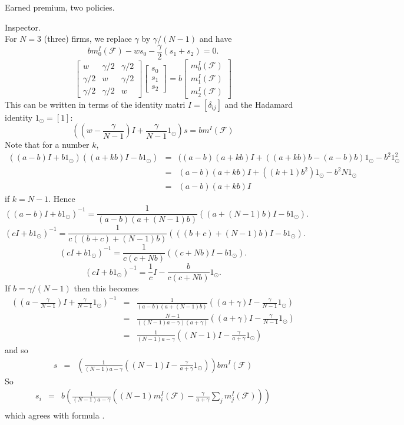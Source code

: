 \begin{example}{Earned premium, two policies.}
\begin{example}{Inspector.}
\[		\]
		For $N=3$ (three) firms,  we replace $\gamma$ by $\gamma/(N-1)$ and have
		\[
			bm^I_0(\mathscr F)-ws_0-\frac{\gamma}{2} (s_{1}+s_2)=0.
		\]
		\[
			\begin{bmatrix}
				w & \gamma/2 & \gamma/2 \\
				\gamma/2 & w & \gamma/2 \\
				\gamma/2 & \gamma/2 & w
			\end{bmatrix}
			\begin{bmatrix}
				s_0\\
				s_1\\
				s_2
			\end{bmatrix}
			=b
			\begin{bmatrix}
				m^I_0(\mathscr F)\\
				m^I_1(\mathscr F)\\
				m^I_2(\mathscr F)
			\end{bmatrix}
		\]
		This can be written in terms of the identity matri $I=[\delta_{ij}]$ and the Hadamard identity $1_{\odot}=[1]$:
		\[
			\left(\left(w-\frac{\gamma}{N-1}\right)I + \frac{\gamma}{N-1}1_{\odot}\right)s = b m^I(\mathscr F)
		\]
		Note that for a number $k$, %
		\begin{eqnarray*}
			((a-b)I + b1_{\odot})
			((a+kb)I - b1_{\odot})
			&=& ((a-b)(a+kb)I + ((a+kb)b-(a-b)b)1_{\odot}-b^2 1_{\odot}^2\\
			&=& (a-b)(a+kb)I + ((k+1)b^2)1_{\odot}-b^2 N 1_{\odot}\\
			&=& (a-b)(a+kb)I
		\end{eqnarray*}
		if $k=N-1$.
		Hence
		\[
			\left((a-b)I+b1_{\odot}\right)^{-1}=\frac{1}{(a-b)(a+(N-1)b)}((a+(N-1)b)I - b1_{\odot}).
		\]
		\[
			\left(cI+b1_{\odot}\right)^{-1}=\frac{1}{c((b+c)+(N-1)b)}(((b+c)+(N-1)b)I - b1_{\odot}).
		\]
		\[
			\left(cI+b1_{\odot}\right)^{-1}=\frac{1}{c(c+Nb)}((c+Nb)I - b1_{\odot}).
		\]
		\[
			\left(cI+b1_{\odot}\right)^{-1}=\frac1c I - \frac{b}{c(c+Nb)}1_{\odot}.
		\]
		If $b=\gamma/(N-1)$ then this becomes
		\begin{eqnarray*}
			\left((a-\frac{\gamma}{N-1})I+\frac{\gamma}{N-1}1_{\odot}\right)^{-1}
			&=&\frac{1}{(a-b)(a+(N-1)b)}\left((a+\gamma)I - \frac{\gamma}{N-1}1_{\odot}\right)\\
			&=&\frac{N-1}{((N-1)a-\gamma)(a+\gamma)}\left((a+\gamma)I - \frac{\gamma}{N-1}1_{\odot}\right)\\
			&=&\frac{1}{(N-1)a-\gamma}\left((N-1)I - \frac{\gamma}{a+\gamma}1_{\odot}\right)
		\end{eqnarray*}
		and so
		\begin{eqnarray*}
			s &=&   \left(\frac{1}{(N-1)a-\gamma}\left((N-1)I - \frac{\gamma}{a+\gamma}1_{\odot}\right)\right) b m^I(\mathscr F)
		\end{eqnarray*}
		So
		\begin{eqnarray*}
			s_i
			  &=& b \left(\frac{1}{(N-1)a-\gamma}\left((N-1)m^I_i(\mathscr F) - \frac{\gamma}{a+\gamma}\sum_j m^I_j(\mathscr F)\right)\right)\\
		\end{eqnarray*}
		which agrees with formula .



\end{example}
\end{example}
